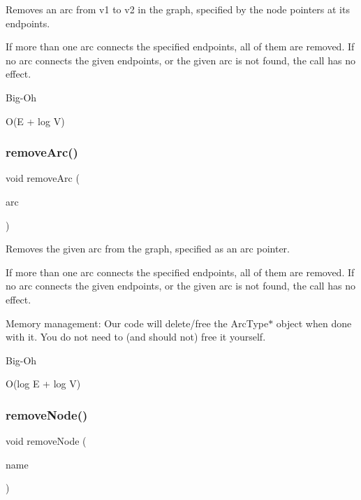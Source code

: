 Removes an arc from v1 to v2 in the graph, specified by the node pointers at its endpoints. 

If more than one arc connects the specified endpoints, all of them are removed. If no arc connects the given endpoints, or the given arc is not found, the call has no effect. \begin{DoxyRefDesc}{Big-\/\+Oh}
\item[\mbox{\hyperlink{BigOh__BigOh000085}{Big-\/\+Oh}}]O(E + log V) \end{DoxyRefDesc}
\mbox{\label{classGraph_a9d6580d1b0228fe6c1a02dfe70de1abf}} 
\subsubsection{\texorpdfstring{remove\+Arc()}{removeArc()}\hspace{0.1cm}{\footnotesize\ttfamily [3/3]}}
{\footnotesize\ttfamily void remove\+Arc (\begin{DoxyParamCaption}\item[{Arc\+Type $\ast$}]{arc }\end{DoxyParamCaption})}



Removes the given arc from the graph, specified as an arc pointer. 

If more than one arc connects the specified endpoints, all of them are removed. If no arc connects the given endpoints, or the given arc is not found, the call has no effect.

Memory management\+: Our code will delete/free the Arc\+Type$\ast$ object when done with it. You do not need to (and should not) free it yourself. \begin{DoxyRefDesc}{Big-\/\+Oh}
\item[\mbox{\hyperlink{BigOh__BigOh000086}{Big-\/\+Oh}}]O(log E + log V) \end{DoxyRefDesc}
\mbox{\label{classGraph_a2d5f7ee89176144ed4c5c6b08a233aa6}} 
\subsubsection{\texorpdfstring{remove\+Node()}{removeNode()}\hspace{0.1cm}{\footnotesize\ttfamily [1/2]}}
{\footnotesize\ttfamily void remove\+Node (\begin{DoxyParamCaption}\item[{const std\+::string \&}]{name }\end{DoxyParamCaption})}



